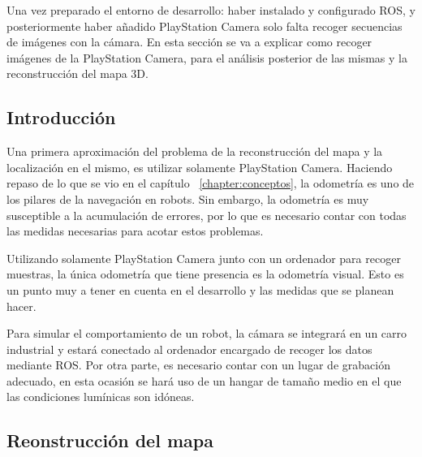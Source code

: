 

Una vez preparado el entorno de desarrollo: haber instalado y configurado ROS,
y posteriormente haber añadido PlayStation Camera solo falta recoger secuencias
de imágenes con la cámara. En esta sección se va a explicar como recoger
imágenes de la PlayStation Camera, para el análisis posterior de las mismas y
la reconstrucción del mapa 3D.

\subsection{Introducción}

Una primera aproximación del problema de la reconstrucción del mapa y la
localización en el mismo, es utilizar solamente PlayStation Camera. Haciendo
repaso de lo que se vio en el capítulo ~\ref{chapter:conceptos}, la odometría es
uno de los pilares de la navegación en robots. Sin embargo, la odometría es muy
susceptible a la acumulación de errores, por lo que es necesario contar con
todas las medidas necesarias para acotar estos problemas.

Utilizando solamente PlayStation Camera junto con un ordenador para recoger
muestras, la única odometría que tiene presencia es la odometría visual. Esto es
un punto muy a tener en cuenta en el desarrollo y las medidas que se planean
hacer.


Para simular el comportamiento de un robot, la cámara se integrará en un carro
industrial y estará conectado al ordenador encargado de recoger los datos
mediante ROS. Por otra parte, es necesario contar con un lugar de grabación
adecuado, en esta ocasión se hará uso de un hangar de tamaño medio en el que las
condiciones lumínicas son idóneas.

\subsection{Reonstrucción del mapa}

